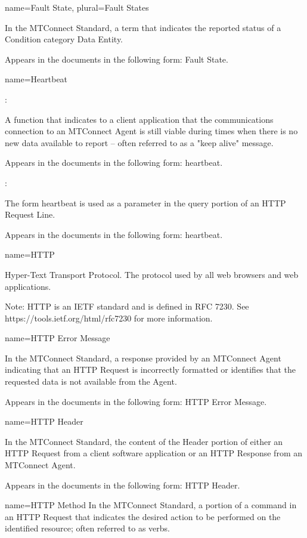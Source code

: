 {
  name={Fault State},
  plural={Fault States}
}
{
	In the MTConnect Standard, a term that indicates the reported status of a Condition category Data Entity.   

	Appears in the documents in the following form: Fault State.
}


{
  name={Heartbeat}
}
{
	:

	A function that indicates to a client application that the communications connection to an MTConnect Agent is still viable during times when there is no new data available to report – often referred to as a "keep alive" message.

	Appears in the documents in the following form: heartbeat.

	:

	The form heartbeat is used as a parameter in the query portion of an HTTP Request Line.

	Appears in the documents in the following form: heartbeat.
}


{
  name={HTTP}
}
{
	Hyper-Text Transport Protocol.  The protocol used by all web browsers and web applications.

	Note:  HTTP is an IETF standard and is defined in RFC 7230.  See https://tools.ietf.org/html/rfc7230 for more information.
}


{
  name={HTTP Error Message}
}
{
	In the MTConnect Standard, a response provided by an MTConnect Agent indicating that an HTTP Request is incorrectly formatted or identifies that the requested data is not available from the Agent.  

	Appears in the documents in the following form: HTTP Error Message.
}


{
  name={HTTP Header}
}
{
	In the MTConnect Standard, the content of the Header portion of either an HTTP Request from a client software application or an HTTP Response from an MTConnect Agent.

	Appears in the documents in the following form: HTTP Header.
}


{
  name={HTTP Method}
}
{
	In the MTConnect Standard, a portion of a command in an HTTP Request that indicates the desired action to be performed on the identified resource; often referred to as verbs.
}


